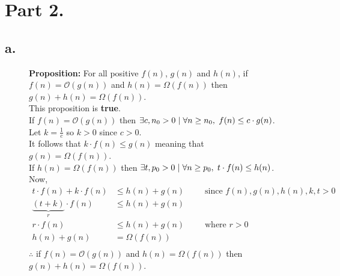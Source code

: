 \documentclass{article}
\begin{document}
    \newpage

    \section*{Part 2.}
        
        \subsection*{a.}

            \begin{figure}[!ht]

                \centering
                \begin{minipage}{0.9\textwidth}
                    \textbf{Proposition:} For all positive $f(n)$, $g(n)$ and $h(n)$, if $f(n) = \mathcal{O}(g(n))$ and $h(n) = \Omega(f(n))$
                    then $g(n) + h(n) = \Omega(f(n))$.\\

                    This proposition is \textbf{true}.\\

                    If $f(n) = \mathcal{O}(g(n))$ then $\exists c, n_{0} > 0 \hspace*{3pt} | \hspace*{3pt} \forall n \geq n_{0}, \hspace*{3pt} f(n) \leq c \cdot g(n)$.\\
                    Let $k = \frac{1}{c}$ so $k > 0$ since $c > 0$.\\
                    It follows that $k \cdot f(n) \leq g(n)$ meaning that $g(n) = \Omega(f(n))$.\\
                    
                    If $h(n) = \Omega(f(n))$ then $\exists t, p_{0} > 0 \hspace*{3pt} | \hspace*{3pt} \forall n \geq p_{0}, \hspace*{3pt} t \cdot f(n) \leq h(n)$.\\

                    Now,
                    \begin{align*}
                        t \cdot f(n) + k \cdot f(n)                  &\leq          h(n) + g(n) \hspace{25pt}\text{ since } f(n), g(n), h(n), k, t > 0\\
                        \underbrace{(t + k)}_{r} \cdot f(n)          &\leq          h(n) + g(n)\\
                        r \cdot f(n)                                 &\leq          h(n) + g(n) \hspace{25pt}\text{ where } r > 0\\
                        h(n) + g(n)                                  &=             \Omega(f(n))\\
                    \end{align*}
                    $\therefore$ if $f(n) = \mathcal{O}(g(n))$ and $h(n) = \Omega(f(n))$ then $g(n) + h(n) = \Omega(f(n))$.
                \end{minipage}

            \end{figure}
\end{document}
